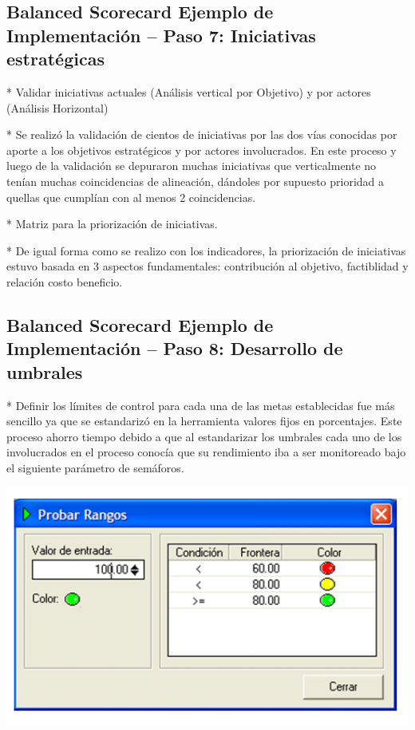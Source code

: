 \subsection{Balanced Scorecard Ejemplo de Implementación – Paso 7: Iniciativas estratégicas}
\item {* Validar iniciativas actuales  (Análisis vertical por Objetivo) y por actores (Análisis Horizontal)

* Se realizó la validación de cientos de iniciativas por las dos vías conocidas por aporte a los objetivos estratégicos y por actores involucrados. En este proceso y luego de la validación se depuraron muchas iniciativas que verticalmente no tenían muchas coincidencias de alineación, dándoles por supuesto prioridad a quellas que cumplían con al menos 2 coincidencias.

* Matriz para la priorización de iniciativas.

* De igual forma como se realizo con los indicadores, la priorización de iniciativas estuvo basada en 3 aspectos fundamentales: contribución al objetivo, factiblidad y relación costo beneficio.}

\subsection{Balanced Scorecard Ejemplo de Implementación – Paso 8: Desarrollo de umbrales}
\item {* Definir los límites de control para cada una de las metas establecidas fue más sencillo ya que se estandarizó en la herramienta valores fijos en porcentajes. Este proceso ahorro tiempo debido a que al estandarizar los umbrales cada uno de los involucrados en el proceso conocía que su rendimiento iba a ser monitoreado bajo el siguiente parámetro de semáforos.}
\begin{center}
\includegraphics[width=15cm]{./Imagenes/img01.png}
\end{center}
